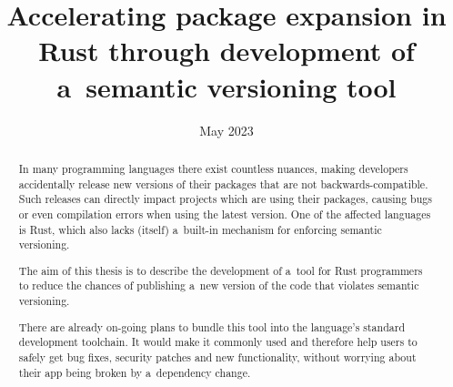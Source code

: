 \documentclass[licencjacka,en]{pracamgr}
\date{May 2023}
\title{Accelerating package expansion in Rust through development of a~semantic versioning tool}
\begin{document}
\maketitle

\begin{abstract}
In many programming languages there exist countless nuances, making developers accidentally release
new versions of their packages that are not backwards-compatible. Such releases can directly impact
projects which are using their packages, causing bugs or even compilation errors when using the
latest version. One of the affected languages is Rust, which also lacks (itself) a~built-in
mechanism for enforcing semantic versioning.

The aim of this thesis is to describe the development of a~tool for Rust programmers to reduce the
chances of publishing a~new version of the code that violates semantic versioning.

There are already on-going plans to bundle this tool into the language's standard
development toolchain. It would make it commonly used and therefore help users to safely get
bug fixes, security patches and new functionality, without worrying about their app being broken
by a~dependency change.
\end{abstract}




\tableofcontents
\end{document}
